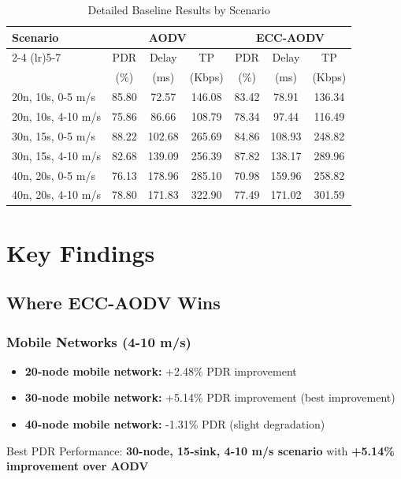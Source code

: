 \documentclass[11pt,a4paper]{article}
\begin{document}
\begin{table}[H]
\centering
\caption{Detailed Baseline Results by Scenario}
\begin{tabular}{lcccccc}
\toprule
\textbf{Scenario} & \multicolumn{3}{c}{\textbf{AODV}} & \multicolumn{3}{c}{\textbf{ECC-AODV}} \\
\cmidrule(lr){2-4} \cmidrule(lr){5-7}
& PDR & Delay & TP & PDR & Delay & TP \\
& (\%) & (ms) & (Kbps) & (\%) & (ms) & (Kbps) \\
\midrule
20n, 10s, 0-5 m/s & 85.80 & 72.57 & 146.08 & 83.42 & 78.91 & 136.34 \\
20n, 10s, 4-10 m/s & 75.86 & 86.66 & 108.79 & 78.34 & 97.44 & 116.49 \\
30n, 15s, 0-5 m/s & 88.22 & 102.68 & 265.69 & 84.86 & 108.93 & 248.82 \\
30n, 15s, 4-10 m/s & 82.68 & 139.09 & 256.39 & 87.82 & 138.17 & 289.96 \\
40n, 20s, 0-5 m/s & 76.13 & 178.96 & 285.10 & 70.98 & 159.96 & 258.82 \\
40n, 20s, 4-10 m/s & 78.80 & 171.83 & 322.90 & 77.49 & 171.02 & 301.59 \\
\bottomrule
\end{tabular}
\end{table}

\section{Key Findings}

\subsection{Where ECC-AODV Wins}

\subsubsection{Mobile Networks (4-10 m/s)}
\begin{itemize}
    \item \textbf{20-node mobile network:} +2.48\% PDR improvement
    \item \textbf{30-node mobile network:} +5.14\% PDR improvement (best improvement)
    \item \textbf{40-node mobile network:} -1.31\% PDR (slight degradation)
\end{itemize}

Best PDR Performance: \textbf{30-node, 15-sink, 4-10 m/s scenario} with \textbf{+5.14\% improvement over AODV}
\end{document}
